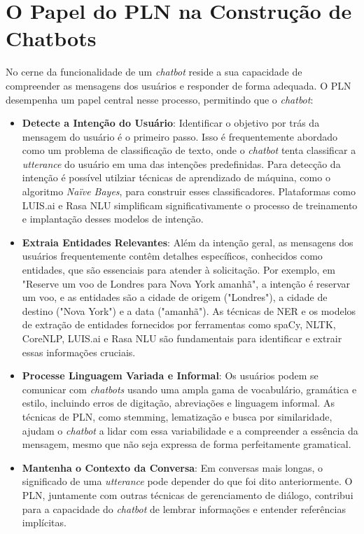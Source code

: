 \documentclass[14pt,a4paper,oneside]{book}
\begin{document}
\section{O Papel do PLN na Construção de Chatbots}

No cerne da funcionalidade de um \textit{chatbot} reside a sua capacidade de compreender as mensagens dos usuários e responder de forma adequada. O PLN desempenha um papel central nesse processo, permitindo que o \textit{chatbot}:

\begin{itemize}
    \item \textbf{Detecte a Intenção do Usuário}: Identificar o objetivo por trás da mensagem do usuário é o primeiro passo. Isso é frequentemente abordado como um problema de classificação de texto, onde o \textit{chatbot} tenta classificar a \textit{utterance} do usuário em uma das intenções predefinidas. Para detecção da intenção é possível utilziar técnicas de aprendizado de máquina, como o algoritmo \textit{Naïve Bayes}, para construir esses classificadores. Plataformas como LUIS.ai e Rasa NLU simplificam significativamente o processo de treinamento e implantação desses modelos de intenção.
    \item \textbf{Extraia Entidades Relevantes}: Além da intenção geral, as mensagens dos usuários frequentemente contêm detalhes específicos, conhecidos como entidades, que são essenciais para atender à solicitação. Por exemplo, em "Reserve um voo de Londres para Nova York amanhã", a intenção é reservar um voo, e as entidades são a cidade de origem ("Londres"), a cidade de destino ("Nova York") e a data ("amanhã"). As técnicas de NER e os modelos de extração de entidades fornecidos por ferramentas como spaCy, NLTK, CoreNLP, LUIS.ai e Rasa NLU são fundamentais para identificar e extrair essas informações cruciais.
    \item \textbf{Processe Linguagem Variada e Informal}: Os usuários podem se comunicar com \textit{chatbots} usando uma ampla gama de vocabulário, gramática e estilo, incluindo erros de digitação, abreviações e linguagem informal. As técnicas de PLN, como stemming, lematização e busca por similaridade, ajudam o \textit{chatbot} a lidar com essa variabilidade e a compreender a essência da mensagem, mesmo que não seja expressa de forma perfeitamente gramatical.
    \item \textbf{Mantenha o Contexto da Conversa}: Em conversas mais longas, o significado de uma \textit{utterance} pode depender do que foi dito anteriormente. O PLN, juntamente com outras técnicas de gerenciamento de diálogo, contribui para a capacidade do \textit{chatbot} de lembrar informações e entender referências implícitas.
\end{itemize}
\end{document}
